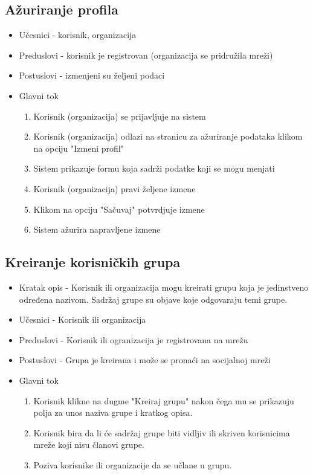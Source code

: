 \subsection{Ažuriranje profila}
\begin{itemize}
\item Učesnici - korisnik, organizacija
\item Preduslovi - korisnik je registrovan (organizacija se pridružila mreži)
\item Postuslovi - izmenjeni su željeni podaci
\item Glavni tok
\begin{enumerate}
\item Korisnik (organizacija) se prijavljuje na sistem
\item Korisnik (organizacija) odlazi na stranicu za ažuriranje podataka klikom na opciju "Izmeni profil"
\item Sistem prikazuje formu koja sadrži podatke koji se mogu menjati
\item Korisnik (organizacija) pravi željene izmene
\item Klikom na opciju "Sačuvaj" potvrdjuje izmene
\item Sistem ažurira napravljene izmene
\end{enumerate}
\end{itemize}

\subsection{Kreiranje korisničkih grupa}
\begin{itemize}
\item Kratak opis - Korisnik ili organizacija mogu kreirati grupu koja je jedinstveno određena nazivom. Sadržaj grupe su objave koje odgovaraju temi grupe.
\item Učesnici - Korisnik ili organizacija
\item Preduslovi - Korisnik ili ogranizacija je registrovana na mrežu
\item Postuslovi - Grupa je kreirana i može se pronaći na socijalnoj mreži 
\item Glavni tok
    \begin{enumerate}
	\item Korisnik klikne na dugme "Kreiraj grupu" nakon čega mu se prikazuju polja za unos naziva grupe i kratkog opisa.
	\item Korisnik bira da li će sadržaj grupe biti vidljiv ili skriven korisnicima mreže koji nisu članovi grupe.
	\item Poziva korisnike ili organizacije da se učlane u grupu.
    \end{enumerate}
\end{itemize}


